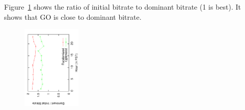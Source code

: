 
Figure~\ref{fig:initvsdom} shows the ratio of initial bitrate to dominant bitrate (1 is best). It shows that GO is close to dominant bitrate.

\begin{figure}[h!]
\centering
 \includegraphics[width=0.25\textwidth, angle=270] {figures/eval-initvsdom.pdf}
\label{fig:initvsdom}
\end{figure}

